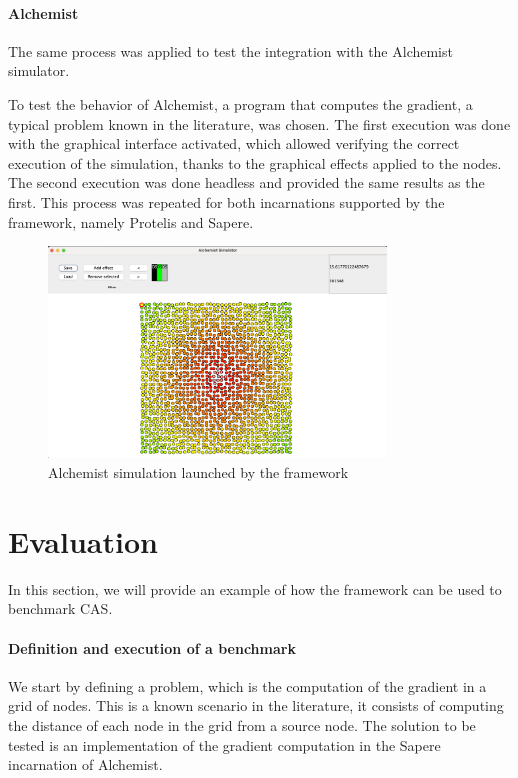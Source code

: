 \documentclass[12pt,a4paper,openright,twoside]{book}
\begin{document}
\paragraph*{Alchemist}
The same process was applied to test the integration with the Alchemist simulator.

To test the behavior of Alchemist, a program that computes the gradient, a typical problem known in the literature, was chosen. 
The first execution was done with the graphical interface activated, which allowed verifying the correct execution of the simulation, thanks to the graphical effects applied to the nodes.
The second execution was done headless and provided the same results as the first. This process was repeated for both incarnations supported by the framework, namely Protelis and Sapere.

\begin{figure}[H]
  \centering
  \includegraphics[width=0.8\textwidth]{figures/gradient-execution.png}
  \caption{Alchemist simulation launched by the framework}
\end{figure}

\section{Evaluation}

In this section, we will provide an example of how the framework can be used to benchmark \ac*{CAS}.

\paragraph*{Definition and execution of a benchmark}

We start by defining a problem, which is the computation of the gradient in a grid of nodes.
This is a known scenario in the literature, it consists of computing the distance of each node in the grid from a source node.
The solution to be tested is an implementation of the gradient computation in the Sapere incarnation of Alchemist.
\end{document}
